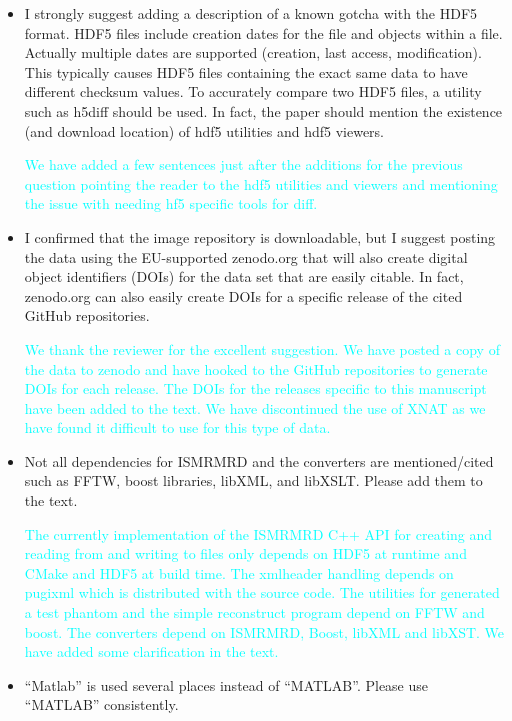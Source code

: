 \documentclass[12pt, draft]{article}
\makeatletter
\def\namedlabel#1#2{\begingroup#2\def\@currentlabel{#2}\phantomsection\label{#1}\endgroup}
\newcommand{\question}[1]{\item[\namedlabel{q#1}{#1}]}
\newcommand{\response}[1]{\textcolor{cyan}{#1}}
\makeatother
\begin{document}
{\begin{itemize}
\response{We have added several sentences to the ``File container" section addressing this point.  We thank the reviewer for suggesting the references to BIOM and the list projects involving HDF5.}

\question{R2.11} I strongly suggest adding a description of a known gotcha with the HDF5 format. HDF5 files include creation dates for the file and objects within a file. Actually multiple dates are supported (creation, last access, modification). This typically causes HDF5 files containing the exact same data to have different checksum values. To accurately compare two HDF5 files, a utility such as h5diff should be used. In fact, the paper should mention the existence (and download location) of hdf5 utilities and hdf5 viewers.

\response{We have added a few sentences just after the additions for the previous question pointing the reader to the hdf5 utilities and viewers and mentioning the issue with needing hf5 specific tools for diff.}

\question{R2.12} I confirmed that the image repository is downloadable, but I suggest posting the data using the EU-supported zenodo.org that will also create digital object identifiers (DOIs) for the data set that are easily citable. In fact, zenodo.org can also easily create DOIs for a specific release of the cited GitHub repositories.

\response{We thank the reviewer for the excellent suggestion.  We have posted a copy of the data to zenodo and have hooked to the GitHub repositories to generate DOIs for each release.  The DOIs for the releases specific to this manuscript have been added to the text.  We have discontinued the use of XNAT as we have found it difficult to use for this type of data.}

\question{R2.13} Not all dependencies for ISMRMRD and the converters are mentioned/cited such as FFTW, boost libraries, libXML, and libXSLT. Please add them to the text.

\response{The currently implementation of the ISMRMRD C++ API for creating and reading from and writing to files only depends on HDF5 at runtime and CMake and HDF5 at build time.  The xmlheader handling depends on pugixml which is distributed with the source code.  The utilities for generated a test phantom and the simple reconstruct program depend on FFTW and boost.  The converters depend on ISMRMRD, Boost, libXML and libXST.  We have added some clarification in the text.}

\question{R2.14} ``Matlab'' is used several places instead of ``MATLAB''. Please use ``MATLAB'' consistently.


\end{itemize}}
\end{document}
